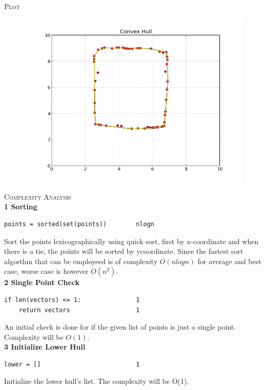 \documentclass[pdftex,12pt,a4paper]{article}
\newcommand{\nspace}{\\[0.25cm]}
\newcommand{\lspace}{\\[0.50cm]}
\begin{document}
\newpage
\textsc{Plot} \hfill \nspace

\begin{figure}[h!]
  \centering
	\includegraphics[scale=0.65]{img/monotone_test_4.png}
\end{figure}




\textsc{\Large Complexity Analysis} \hfill \nspace

{\bf \large 1 Sorting}
\begin{verbatim}
points = sorted(set(points))        nlogn
\end{verbatim}

Sort the points lexicographically using quick sort, first by x-coordinate and when there is a tie, the points will be sorted by y\-coordinate. Since the fastest sort algorthm that can be employeed is of complexity $O(n log n)$ for average and best case, worse case is however $O(n^2)$.\lspace


{\bf \large 2 Single Point Check}
\begin{verbatim}
if len(vectors) <= 1:               1
    return vectors                  1
\end{verbatim}

An initial check is done for if the given list of points is just a single point. Complexity will be $O(1)$.\lspace


{\bf \large 3 Initialize Lower Hull}
\begin{verbatim}
lower = []                          1
\end{verbatim}

Initialize the lower hull's list. The complexity will be O(1).\lspace
\end{document}

